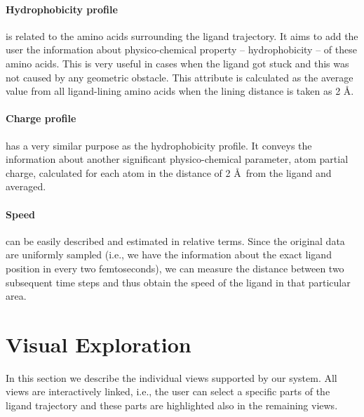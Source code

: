 \documentclass[twocolumn]{bmcart}%
\begin{document}
\paragraph{\textbf{Hydrophobicity profile}} is related to the amino acids surrounding the ligand trajectory.
It aims to add the user the information about physico-chemical property -- hydrophobicity -- of these amino acids. 
This is very useful in cases when the ligand got stuck and this was not caused by any geometric obstacle.
This attribute is calculated as the average value from all ligand-lining amino acids when the lining distance is taken as 2 \AA.

\paragraph{\textbf{Charge profile}} has a very similar purpose as the hydrophobicity profile.
It conveys the information about another significant physico-chemical parameter, atom partial charge, calculated for each atom in the distance of 2 \AA\ from the ligand and averaged.

\paragraph{\textbf{Speed}} can be easily described and estimated in relative terms.
Since the original data are uniformly sampled (i.e., we have the information about the exact ligand position in every two femtoseconds), we can measure the distance between two subsequent time steps and thus obtain the speed of the ligand in that particular area.

\section*{Visual Exploration}
In this section we describe the individual views supported by our system.
All views are interactively linked, i.e., the user can select a specific parts of the ligand trajectory and these parts are highlighted also in the remaining views.
\end{document}
